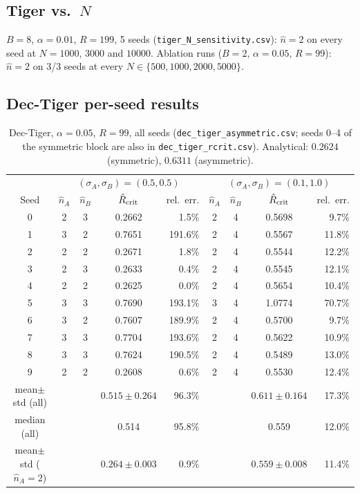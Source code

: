 \documentclass[10pt]{article}
\begin{document}
\subsection{Tiger vs.\ $N$}
$B=8$, $\alpha=0.01$, $R=199$, 5 seeds (\texttt{tiger\_N\_sensitivity.csv}):
$\hat n=2$ on every seed at $N=1000$, $3000$ and $10000$.  Ablation runs
($B=2$, $\alpha=0.05$, $R=99$): $\hat n=2$ on 3/3 seeds at every
$N\in\{500,1000,2000,5000\}$.

\subsection{Dec-Tiger per-seed results}

\begin{table}[h]
\centering
\small
\caption{Dec-Tiger, $\alpha=0.05$, $R=99$, all seeds
  (\texttt{dec\_tiger\_asymmetric.csv}; seeds 0--4 of the symmetric block are
  also in \texttt{dec\_tiger\_rcrit.csv}).  Analytical: $0.2624$ (symmetric),
  $0.6311$ (asymmetric).}
\label{tab:rcrit-full}
\begin{tabular}{c|cccr|cccr}
\toprule
 & \multicolumn{4}{c|}{$(\sigma_A,\sigma_B)=(0.5,0.5)$} & \multicolumn{4}{c}{$(\sigma_A,\sigma_B)=(0.1,1.0)$}\\
Seed & $\hat n_A$ & $\hat n_B$ & $\hat R_{\rm crit}$ & rel.\ err. & $\hat n_A$ & $\hat n_B$ & $\hat R_{\rm crit}$ & rel.\ err. \\
\midrule
0 & 2 & 3 & 0.2662 & 1.5\%   & 2 & 4 & 0.5698 & 9.7\% \\
1 & 3 & 2 & 0.7651 & 191.6\% & 2 & 4 & 0.5567 & 11.8\% \\
2 & 2 & 2 & 0.2671 & 1.8\%   & 2 & 4 & 0.5544 & 12.2\% \\
3 & 2 & 3 & 0.2633 & 0.4\%   & 2 & 4 & 0.5545 & 12.1\% \\
4 & 2 & 2 & 0.2625 & 0.0\%   & 2 & 4 & 0.5654 & 10.4\% \\
5 & 3 & 3 & 0.7690 & 193.1\% & 3 & 4 & 1.0774 & 70.7\% \\
6 & 3 & 2 & 0.7607 & 189.9\% & 2 & 4 & 0.5700 & 9.7\% \\
7 & 3 & 3 & 0.7704 & 193.6\% & 2 & 4 & 0.5622 & 10.9\% \\
8 & 3 & 3 & 0.7624 & 190.5\% & 2 & 4 & 0.5489 & 13.0\% \\
9 & 2 & 2 & 0.2608 & 0.6\%   & 2 & 4 & 0.5530 & 12.4\% \\
\midrule
mean$\pm$std (all) & & & $0.515\pm0.264$ & 96.3\% & & & $0.611\pm0.164$ & 17.3\% \\
median (all)       & & & 0.514 & 95.8\%  & & & 0.559 & 12.0\% \\
mean$\pm$std ($\hat n_A=2$) & & & $0.264\pm0.003$ & 0.9\% & & & $0.559\pm0.008$ & 11.4\% \\
\bottomrule
\end{tabular}
\end{table}
\end{document}

